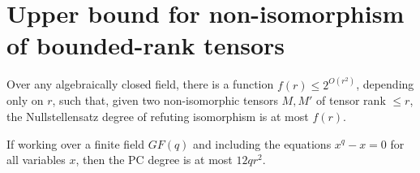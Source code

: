 

\section{Upper bound for non-isomorphism of bounded-rank tensors} \label{sec:upper}
\begin{theorem} \label{thm:lowrank}
Over any algebraically closed field, there is a function $f(r) \leq 2^{O(r^2)}$, depending only on $r$, such that, given two non-isomorphic tensors $M,M'$ of tensor rank $\leq r$, the Nullstellensatz degree of refuting isomorphism is at most $f(r)$.

If working over a finite field $GF(q)$ and including the equations $x^q - x = 0$ for all variables $x$, then the PC degree is at most $12qr^2$.
\end{theorem} 

